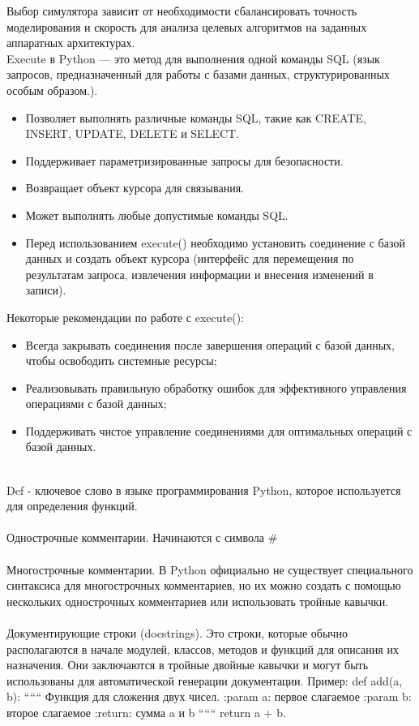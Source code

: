 \documentclass[12pt,a4paper]{article}
\begin{document}
		Выбор симулятора зависит от необходимости сбалансировать точность моделирования и скорость для анализа целевых алгоритмов на заданных аппаратных архитектурах.\\
		
		
		Execute в Python — это метод для выполнения одной команды SQL (язык запросов, предназначенный для работы с базами данных, структурированных особым образом.).
		\begin{itemize}
			\item Позволяет выполнять различные команды SQL, такие как CREATE, INSERT, UPDATE, DELETE и SELECT.
			\item Поддерживает параметризированные запросы для безопасности.
			\item Возвращает объект курсора для связывания.
			\item Может выполнять любые допустимые команды SQL.
			\item Перед использованием execute() необходимо установить соединение с базой данных и создать объект курсора (интерфейс для перемещения по результатам запроса, извлечения информации и внесения изменений в записи).
		\end{itemize}
			 Некоторые рекомендации по работе с execute():
			 		\begin{itemize}
			\item Всегда закрывать соединения после завершения операций с базой данных, чтобы освободить системные ресурсы;
		 	\item Реализовывать правильную обработку ошибок для эффективного управления операциями с базой данных;
		\item Поддерживать чистое управление соединениями для оптимальных операций с базой данных.
		\end{itemize}
		\hspace{1em}\\
		Def - ключевое слово в языке программирования Python, которое используется для определения функций.\\
		\hspace{1em}\\
		Однострочные комментарии. Начинаются с символа \#\\
		\hspace{1em}\\
		Многострочные комментарии. В Python официально не существует специального синтаксиса для многострочных комментариев, но их можно создать с помощью нескольких однострочных комментариев или использовать тройные кавычки.\\
		\hspace{1em}\\
		Документирующие строки (docstrings). Это строки, которые обычно располагаются в начале модулей, классов, методов и функций для описания их назначения. Они заключаются в тройные двойные кавычки и могут быть использованы для автоматической генерации документации. Пример: def add(a, b): `````` Функция для сложения двух чисел. :param a: первое слагаемое :param b: второе слагаемое :return: сумма a и b `````` return a + b.\\
\end{document}
